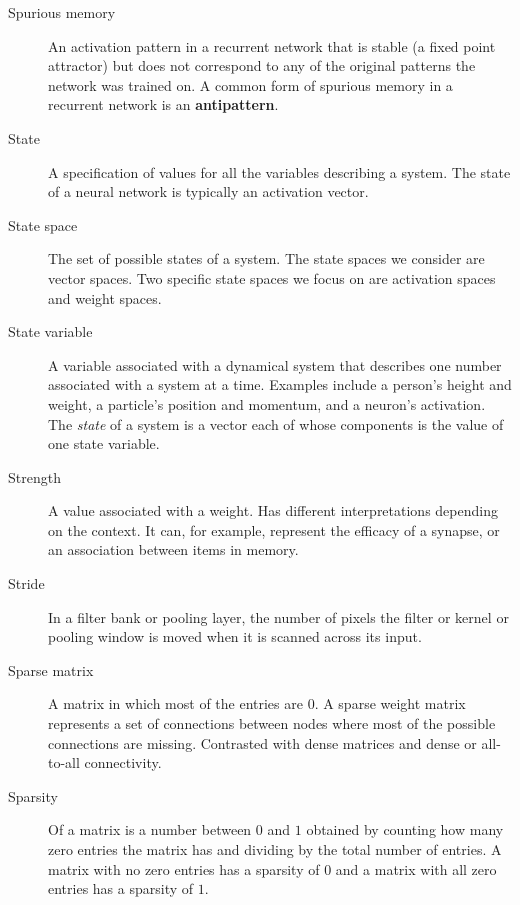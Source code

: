 \begin{description}
\item[Spurious memory] An activation pattern in a recurrent network that is stable (a fixed point attractor) but does not correspond to any of the original patterns the network was trained on. A common form of spurious memory in a recurrent network is an \textbf{antipattern}.

\item[State] A specification of values for all the variables describing a system. The state of a neural network is typically an activation vector.

\item[State space] The set of possible states of a system. The state spaces we consider are vector spaces. Two specific state spaces we focus on are activation spaces and weight spaces.

\item[State variable] A variable associated with a dynamical system that describes one number associated with a system at a time. Examples include a person's height and weight, a particle's position and momentum, and a neuron's activation. The \emph{state} of a system is a vector each of whose components is the value of one state variable. 


\item[Strength] A value associated with a weight. Has different interpretations depending on the context. It can, for example, represent the efficacy of a synapse, or an association between items in memory.

\item[Stride] In a filter bank or pooling layer, the number of pixels the filter or kernel or pooling window is moved when it is scanned across its input.


\item[Sparse matrix] A matrix in which most of the entries are 0. A sparse weight matrix represents a set of connections between nodes where most of the possible connections are missing. Contrasted with dense matrices and dense or all-to-all connectivity. 

\item[Sparsity] Of a matrix is a number between $0$ and $1$ obtained by counting how many zero entries the matrix has and dividing by the total number of entries. A matrix with no zero entries has a sparsity of $0$ and a matrix with all zero entries has a sparsity of $1$.


\end{description}
